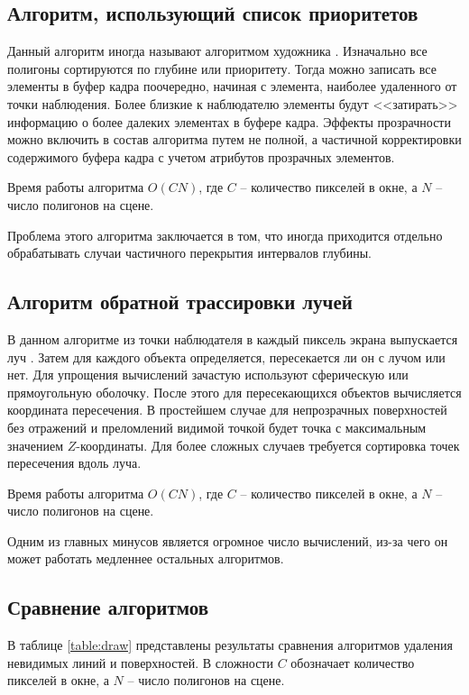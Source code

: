 \subsection{Алгоритм, использующий список приоритетов}

Данный алгоритм иногда называют алгоритмом художника \cite{roberts}. Изначально все полигоны сортируются по глубине или приоритету. Тогда можно записать все элементы в буфер кадра поочередно, начиная с элемента, наиболее удаленного от точки наблюдения. Более близкие к наблюдателю элементы будут <<затирать>> информацию о более далеких элементах в буфере кадра. Эффекты прозрачности можно включить в состав алгоритма путем не полной, а частичной корректировки содержимого буфера кадра с учетом атрибутов прозрачных элементов.

Время работы алгоритма $O(CN)$, где $C$ -- количество пикселей в окне, а $N$ -- число полигонов на сцене. 

Проблема этого алгоритма заключается в том, что иногда приходится отдельно обрабатывать случаи частичного перекрытия интервалов глубины.

\subsection{Алгоритм обратной трассировки лучей}

В данном алгоритме из точки наблюдателя в каждый пиксель экрана выпускается луч \cite{algorithms}. Затем для каждого объекта определяется, пересекается ли он с лучом или нет. Для упрощения вычислений зачастую используют сферическую или прямоугольную оболочку. После этого для пересекающихся объектов вычисляется координата пересечения. В простейшем случае для непрозрачных поверхностей без отражений и преломлений видимой точкой будет точка с максимальным значением $Z$-координаты. Для более сложных случаев требуется сортировка точек пересечения вдоль луча. 

Время работы алгоритма $O(CN)$, где $C$ -- количество пикселей в окне, а $N$ -- число полигонов на сцене. 

Одним из главных минусов является огромное число вычислений, из-за чего он может работать медленнее остальных алгоритмов.

\subsection{Сравнение алгоритмов}

В таблице \ref{table:draw} представлены результаты сравнения алгоритмов удаления невидимых линий и поверхностей. В сложности $C$ обозначает количество пикселей в окне, а $N$ -- число полигонов на сцене.

